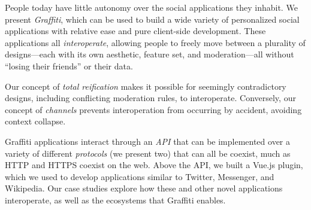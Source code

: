 



People today have little autonomy over the social applications
they inhabit.
We present \emph{Graffiti}, which can be used
to build a wide variety of personalized social applications
with relative ease and pure client-side development. These applications all \emph{interoperate}, allowing people to freely move between
a plurality of designs---each with its own aesthetic, feature set,
and moderation---all without ``losing their friends'' or their data.

Our concept of \emph{total reification} makes it possible
for seemingly contradictory designs, including conflicting
moderation rules, to interoperate.
Conversely, our concept of \emph{channels}
prevents interoperation from occurring by accident, avoiding context collapse.


Graffiti applications interact through an \emph{API} that can be implemented over a variety of different \emph{protocols} (we present two) that can all be coexist, much as HTTP and HTTPS coexist on the web.
Above the API, we built a Vue.js plugin, which we used
to develop applications similar to Twitter, Messenger, and Wikipedia.
Our case studies explore how these and other novel applications interoperate,
as well as the ecosystems that Graffiti enables.
